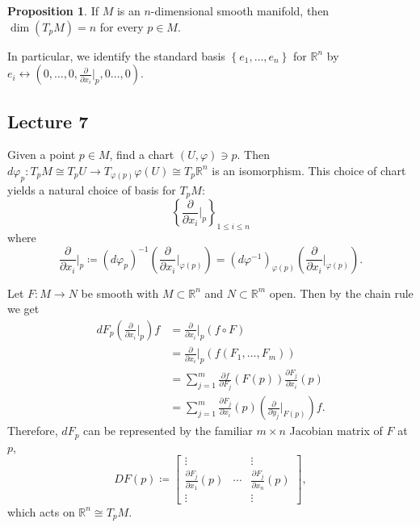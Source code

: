 \documentclass[10pt,letterpaper,cm]{nupset}
\theoremstyle{definition}
\theoremstyle{theorem}
\newtheorem{prop}[definition]{Proposition}
\theoremstyle{remark}
\newcommand{\R}{\mathbb R}
\newcommand{\1}{\mathbf{1}}
\newcommand{\0}{\vec 0}
\begin{document}
\begin{prop}
If $M$ is an $n$-dimensional smooth manifold, then $\dim(T_pM) =n$ for every $p\in M$.
\end{prop}

In particular, we identify the standard basis $\left\{e_1, \ldots, e_n\right\}$ for $\R^n$ by $e_i \leftrightarrow \left(0, \ldots, 0, \frac{\partial}{\partial{x_i}}\bigr\rvert_p, 0 \ldots, 0\right)$.

\subsection{Lecture 7}


Given a point $p\in M$, find a chart $(U, \varphi)\ni p$. Then $d\varphi_p : T_pM \cong T_pU\to T_{\varphi(p)}\varphi(U) \cong T_p \R^n$ is an isomorphism. This choice of chart yields a natural choice of basis for $T_pM$: $$\left\{\frac{\partial}{\partial{x_i}}\bigr\rvert_{p} \right\}_{1\leq i \leq n}$$ where 
\[ \label{eqn:basis}
\frac{\partial}{\partial{x_i}}\bigr\rvert_{p}\coloneqq  \left(d\varphi_p\right)^{-1}\left(\frac{\partial}{\partial{x_i}}\bigr\rvert_{\varphi(p)}\right) = \left(d\varphi^{-1}\right)_{\varphi(p)}\left(\frac{\partial}{\partial{x_i}}\bigr\rvert_{\varphi(p)}\right). \tag{$\ast$}
\]

\smallskip

Let $F: M \to N$ be smooth with $M\subset \R^n$ and $N \subset \R^m$ open. Then by the chain rule we get 
\begin{align*}
dF_p\left(\frac{\partial}{\partial{x_i}}\bigr\rvert_{p}\right)f & = \frac{\partial}{\partial{x_i}}\bigr\rvert_{p}(f \circ F) 
\\ & = \frac{\partial}{\partial{x_i}}\bigr\rvert_{p}(f(F_1, \ldots, F_m)) 
\\ & =\sum_{j=1}^m  \frac{\partial{f}}{\partial{F_j}}(F(p))\frac{\partial{F_j}}{\partial{x_i}}(p)
\\ & = \sum_{j=1}^m \frac{\partial{F_j}}{\partial{x_i}}(p) \left(\frac{\partial}{\partial{y_j}}\bigr\rvert_{F(p)}\right)f.
\end{align*} Therefore, $dF_p$ can be represented by the familiar $m\times n$ Jacobian matrix of $F$ at $p$, 
 $$DF(p) \coloneqq  \begin{bmatrix}  \vdots &  & \vdots \\ \frac{\partial{F_j}}{\partial{x_1}}(p)  & \cdots & \frac{\partial{F_j}}{\partial{x_n}}(p)  \\ \vdots & & \vdots  
\end{bmatrix},$$ which acts on $\R^n \cong T_pM$.
\end{document}
